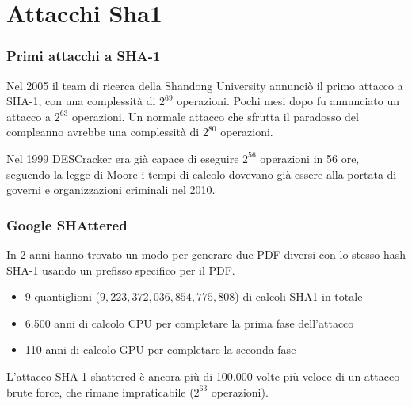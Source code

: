 \section{Attacchi Sha1}

\begin{frame}
\frametitle{Primi attacchi a SHA-1}
Nel 2005 il team di ricerca della Shandong University annunciò il primo attacco a SHA-1, con una complessità di \(2^{69}\) operazioni. Pochi mesi dopo fu annunciato un attacco a \(2^{63}\) operazioni.
Un normale attacco che sfrutta il paradosso del compleanno avrebbe una complessità di \(2^{80}\) operazioni.

\vspace{1cm}

Nel 1999 DESCracker era già capace di eseguire \(2^{56}\) operazioni in 56 ore, seguendo la legge di Moore i tempi di calcolo dovevano già essere alla portata di governi e organizzazioni criminali nel 2010.
\end{frame}


\begin{frame}
\frametitle{Google SHAttered}

In 2 anni hanno trovato un modo per generare due PDF diversi con lo stesso hash SHA-1 usando un prefisso specifico per il PDF.
\begin{itemize}
    \item 9 quantiglioni (\(9,223,372,036,854,775,808\)) di calcoli SHA1 in totale
    \item 6.500 anni di calcolo CPU per completare la prima fase dell'attacco
    \item 110 anni di calcolo GPU per completare la seconda fase 
\end{itemize}

L'attacco SHA-1 shattered è ancora più di 100.000 volte più veloce di un attacco brute force, che rimane impraticabile (\(2^{63}\) operazioni).
\end{frame}
